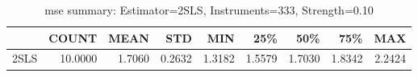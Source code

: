 \begin{table}[ht]
\centering
\caption{mse summary: Estimator=2SLS, Instruments=333, Strength=0.10}
\begin{tabular}{lrrrrrrrr}
\toprule
 & COUNT & MEAN & STD & MIN & 25\% & 50\% & 75\% & MAX \\
\midrule
2SLS & 10.0000 & 1.7060 & 0.2632 & 1.3182 & 1.5579 & 1.7030 & 1.8342 & 2.2424 \\
\bottomrule
\end{tabular}
\end{table}
